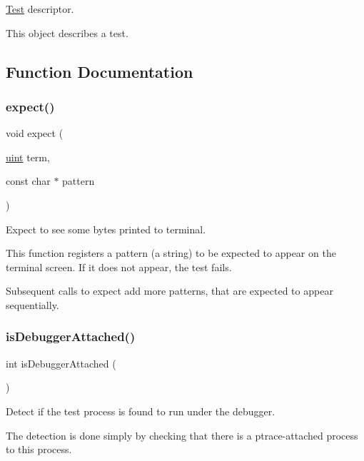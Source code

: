\hyperlink{structTest}{Test} descriptor. 

This object describes a test. 

\subsection{Function Documentation}
\mbox{\label{group__Testing_ga0c4e801b8c3317b802fa4e80e1e26de2}} 
\subsubsection{\texorpdfstring{expect()}{expect()}}
{\footnotesize\ttfamily void expect (\begin{DoxyParamCaption}\item[{\hyperlink{bios_8h_a91ad9478d81a7aaf2593e8d9c3d06a14}{uint}}]{term,  }\item[{const char $\ast$}]{pattern }\end{DoxyParamCaption})}



Expect to see some bytes printed to terminal. 

This function registers a {\ttfamily pattern} (a string) to be expected to appear on the terminal screen. If it does not appear, the test fails.

Subsequent calls to expect add more patterns, that are expected to appear sequentially. \mbox{\label{group__Testing_ga106e4293a3520dae79707bdf492dc68b}} 
\subsubsection{\texorpdfstring{is\+Debugger\+Attached()}{isDebuggerAttached()}}
{\footnotesize\ttfamily int is\+Debugger\+Attached (\begin{DoxyParamCaption}{ }\end{DoxyParamCaption})}



Detect if the test process is found to run under the debugger. 

The detection is done simply by checking that there is a ptrace-\/attached process to this process.

